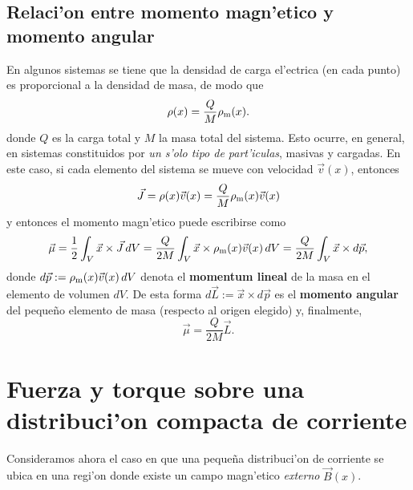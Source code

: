 \subsection{Relaci'on entre momento magn'etico y momento angular}
En algunos sistemas se tiene que la densidad de carga el'ectrica (en cada
punto) es proporcional a la densidad de masa, de modo que
\begin{equation}
 \rho(x)=\frac{Q}{M} \rho_{\rm m}(x).
\end{equation}
donde $Q$ es la carga total y $M$ la masa total del sistema. Esto ocurre, en
general, en sistemas constituidos por \textit{un s'olo tipo de part'iculas},
masivas y cargadas. En este caso, si cada elemento del sistema se mueve
con velocidad $\vec{v}(x)$, entonces
\begin{equation}
\vec{J}=\rho(x)\vec{v}(x)=\frac{Q}{M} \rho_{\rm m}(x)\vec{v}(x)
\end{equation}
y entonces el momento magn'etico puede escribirse como
\begin{equation}
 \vec{\mu}=\frac{1}{2}\int_V \vec{x}\times\vec{J}\,dV=\frac{Q}{2M}\int_V
\vec{x}\times\rho_{\rm m}(x)\vec{v}(x)\,dV=\frac{Q}{2M}\int_V
\vec{x}\times d\vec{p},
\end{equation}
donde $d\vec{p}:=\rho_{\rm m}(x)\vec{v}(x)\,dV$ denota el \textbf{momentum lineal} de la masa en el elemento de volumen $dV$. De esta forma $d\vec{L}:=\vec{x}\times d\vec{p}$ es el \textbf{momento angular} del peque\~no elemento de masa (respecto al origen elegido) y, finalmente,
\begin{equation}
 \boxed{\vec{\mu}=\frac{Q}{2M}\vec{L}.}
\end{equation}

\section{Fuerza y torque sobre una distribuci'on compacta de corriente}
Consideramos ahora el caso en que una peque\~na distribuci'on de corriente
se ubica en una regi'on donde existe un campo magn'etico \textit{externo}
$\vec{B}(x)$.

